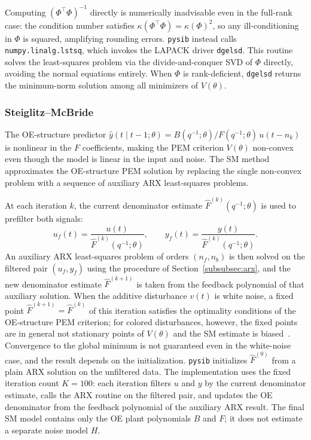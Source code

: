 \documentclass[acmsmall,screen,review]{acmart}
\begin{document}
Computing $(\Phi^\top\Phi)^{-1}$ directly is numerically inadvisable
even in the full-rank case: the condition number satisfies
$\kappa(\Phi^\top\Phi) = \kappa(\Phi)^2$, so any ill-conditioning in
$\Phi$ is squared, amplifying rounding errors.  \texttt{pysib} instead
calls \texttt{numpy.linalg.lstsq}, which invokes the LAPACK driver
\texttt{dgelsd}.  This routine solves the least-squares problem via the
divide-and-conquer SVD of $\Phi$ directly, avoiding the normal equations
entirely.  When $\Phi$ is rank-deficient, \texttt{dgelsd} returns the
minimum-norm solution among all minimizers of $V(\theta)$.

\subsubsection{Steiglitz--McBride}
\label{subsubsec:sm}

The OE-structure predictor
$\hat{y}(t \mid t-1;\theta) = B(q^{-1};\theta)/F(q^{-1};\theta)\,u(t-n_k)$
is nonlinear in the $F$ coefficients, making the PEM criterion
$V(\theta)$ non-convex even though the model is linear in the input and noise.
The SM method approximates the OE-structure PEM solution by replacing the
single non-convex problem with a sequence of auxiliary ARX least-squares
problems.

At each iteration $k$, the current denominator estimate
$\hat{F}^{(k)}(q^{-1};\theta)$ is used to prefilter both signals:
\[
  u_f(t) = \frac{u(t)}{\hat{F}^{(k)}(q^{-1};\theta)}, \qquad
  y_f(t) = \frac{y(t)}{\hat{F}^{(k)}(q^{-1};\theta)}.
\]
An auxiliary ARX least-squares problem of orders $(n_f, n_b)$ is then solved
on the filtered pair $(u_f, y_f)$ using the procedure of
Section~\ref{subsubsec:arx}, and the new denominator estimate
$\hat{F}^{(k+1)}$ is taken from the feedback polynomial of that auxiliary
solution.
When the additive disturbance $v(t)$ is white noise, a fixed point
$\hat{F}^{(k+1)} = \hat{F}^{(k)}$ of this iteration satisfies the
optimality conditions of the OE-structure PEM criterion; for colored
disturbances, however, the fixed points are in general not stationary
points of $V(\theta)$ and the SM estimate is
biased~\cite{stoica1981,ljung1999}.  Convergence to the global minimum is
not guaranteed even in the white-noise case, and the result depends on the
initialization.  \texttt{pysib} initializes $\hat{F}^{(0)}$
from a plain ARX solution on the unfiltered data.  The implementation uses the
fixed iteration count \(K=100\): each iteration filters \(u\) and \(y\) by the
current denominator estimate, calls the ARX routine on the filtered pair, and
updates the OE denominator from the feedback polynomial of the auxiliary ARX
result.  The final SM model contains only the OE plant polynomials \(B\) and
\(F\); it does not estimate a separate noise model \(H\).
\end{document}
